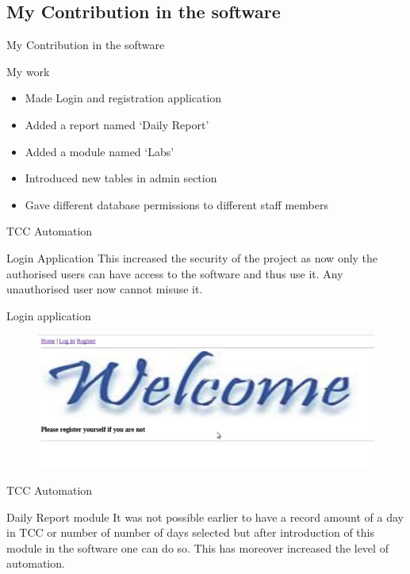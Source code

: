 \subsection{My Contribution in the software}
\begin{frame}{My Contribution in the software}
\begin{block}{My work}
\begin{itemize}
\item<2-> Made Login and registration application
\item<3-> Added a report named `Daily Report'
\item<4-> Added a module named `Labs'
\item<5-> Introduced new tables in admin section
\item<6-> Gave different database permissions to different staff members\\
\end{itemize}
\end{block}
\end{frame}
\newpage
\begin{frame}{TCC Automation}
\begin{block}{Login Application}
This increased the security of the project as now only the authorised users can have access to the software and thus use it. Any unauthorised user now cannot misuse it.
\end{block}
\end{frame}
\newpage
\begin{frame}{Login application}
\begin{figure}
\label{imag}
\centering
\includegraphics[scale=0.2]{Screenshot.png}
\end{figure}
\end{frame}
\newpage
\begin{frame}{TCC Automation}
\begin{block}{Daily Report module}
It was not possible earlier to have a record amount of a day in TCC or number of number of days selected but after introduction of this module in the software one can do so. This has moreover increased the level of automation.
\end{block}
\end{frame}
